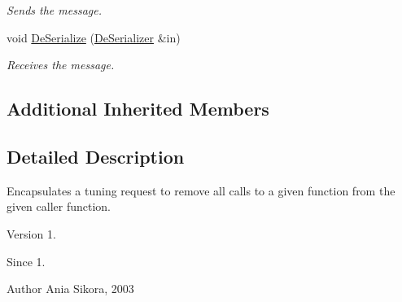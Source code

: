 \begin{DoxyCompactItemize}
\begin{DoxyCompactList}\small\item\em Sends the message. \end{DoxyCompactList}\item 
\hypertarget{class_common_1_1_remove_function_call_request_ac8a636e5865294f6dedd6e340e3a3a7b}{void \hyperlink{class_common_1_1_remove_function_call_request_ac8a636e5865294f6dedd6e340e3a3a7b}{De\-Serialize} (\hyperlink{class_common_1_1_de_serializer}{De\-Serializer} \&in)}\label{class_common_1_1_remove_function_call_request_ac8a636e5865294f6dedd6e340e3a3a7b}

\begin{DoxyCompactList}\small\item\em Receives the message. \end{DoxyCompactList}\end{DoxyCompactItemize}
\subsection*{Additional Inherited Members}


\subsection{Detailed Description}
Encapsulates a tuning request to remove all calls to a given function from the given caller function. 

\begin{DoxyVersion}{Version}
1. 
\end{DoxyVersion}
\begin{DoxySince}{Since}
1. 
\end{DoxySince}
\begin{DoxyAuthor}{Author}
Ania Sikora, 2003 
\end{DoxyAuthor}


